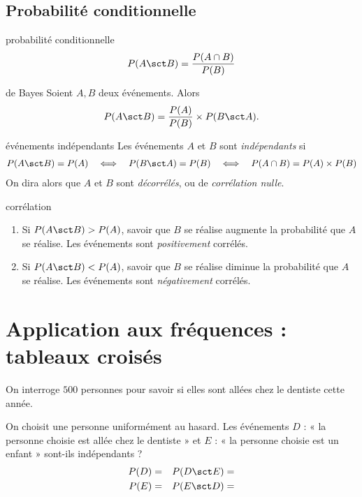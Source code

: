 \subsection{Probabilité conditionnelle}

\begin{definition*}{probabilité conditionnelle}{}
		\[ P(A \sct B) = \dfrac{P(A \cap B)}{P(B)} \]
\end{definition*}



\begin{theorem*}{de Bayes}{}
	Soient $A, B$ deux événements. Alors
		\[ P(A \sct B) = \dfrac{P(A)}{P(B)} \times P(B \sct A). \]
\end{theorem*}


\begin{definition*}{événements indépendants}{}
	Les événements $A$ et $B$ sont \emph{indépendants} si
		\begin{align*}
			P(A \sct B) = P(A) && \iff && P(B \sct A) = P(B) && \iff && P(A\cap B) = P(A) \times P(B)
		\end{align*}
	On dira alors que $A$ et $B$ sont \emph{décorrélés}, ou de \emph{corrélation nulle}.
	
\end{definition*}

\begin{remarque*}{corrélation}{}
	\begin{enumerate}[label=$\bullet$]
		\item Si $P(A \sct B) > P(A)$, savoir que $B$ se réalise augmente la probabilité que $A$ se réalise. Les événements sont \emph{positivement} corrélés.
		\item Si $P(A \sct B) < P(A)$, savoir que $B$ se réalise diminue la probabilité que $A$ se réalise. Les événements sont \emph{négativement} corrélés.
	\end{enumerate}
\end{remarque*}

\section{Application aux fréquences : tableaux croisés}

\begin{exemple*}{}{}
	On interroge $500$ personnes pour savoir si elles sont allées chez le dentiste cette année. 
	
	\begin{center}
	\end{center}
	On choisit une personne uniformément au hasard.
	Les événements $D$ : « la personne choisie est allée chez le dentiste » et $E$ : « la personne choisie est un enfant » sont-ils indépendants ?
	\begin{align*}
		P(D) = &&  P(D \sct E) = \\ P(E) = &&  P(E \sct D) = 
	\end{align*}
\end{exemple*}

